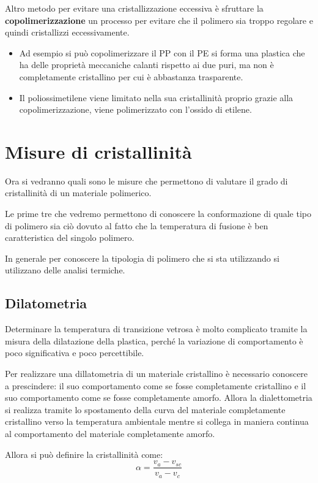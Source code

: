 Altro metodo per evitare una cristallizzazione eccessiva è sfruttare la \textbf{copolimerizzazione} un processo per evitare che il polimero sia troppo regolare e quindi cristallizzi eccessivamente.
\begin{itemize}
\item Ad esempio si può copolimerizzare il \ac{PP} con il \ac{PE} si forma una plastica che ha delle proprietà meccaniche calanti rispetto ai due puri, ma non è completamente cristallino per cui è abbastanza trasparente.
\item Il poliossimetilene viene limitato nella sua cristallinità proprio grazie alla copolimerizzazione, viene polimerizzato con l'ossido di etilene. 
\end{itemize}

\section{Misure di cristallinità}
Ora si vedranno quali sono le misure che permettono di valutare il grado di cristallinità di un materiale polimerico.

Le prime tre che vedremo permettono di conoscere la conformazione di quale tipo di polimero sia ciò dovuto al fatto che la temperatura di fusione è ben caratteristica del singolo polimero.

In generale per conoscere la tipologia di polimero che si sta utilizzando si utilizzano delle analisi termiche.

\subsection{Dilatometria}
Determinare la temperatura di transizione vetrosa è molto complicato tramite la misura della dilatazione della plastica, perché la variazione di comportamento è poco significativa e poco percettibile.

Per realizzare una dillatometria di un materiale cristallino è necessario conoscere a prescindere: il suo comportamento come se fosse completamente cristallino e il suo comportamento come se fosse completamente amorfo.
Allora la dialettometria si realizza tramite lo spostamento della curva del materiale completamente cristallino verso la temperatura ambientale mentre si collega in maniera continua al comportamento del materiale completamente amorfo.

Allora si può definire la cristallinità come:
\begin{equation}
\alpha = \frac{v_a - v_{sc}}{v_a - v_c}
\label{eqn:Dilatometria}
\end{equation}

